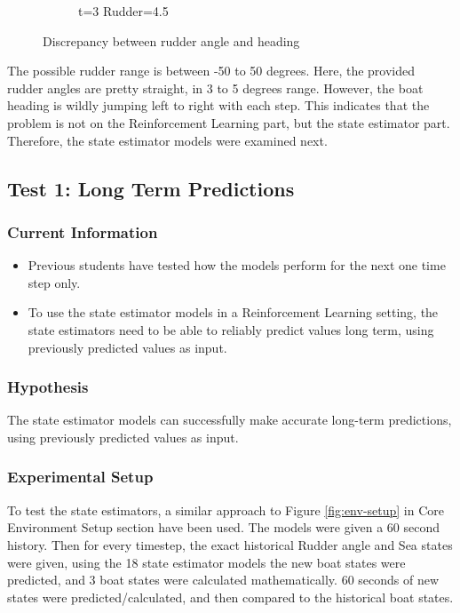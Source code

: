 \documentclass[12pt,twoside]{report}
\begin{document}
\begin{figure}[h]
\begin{subfigure}[b]{0.24\textwidth}
         \caption{t=3 Rudder=4.5}
     \end{subfigure}
        \caption{Discrepancy between rudder angle and heading}
        \label{fig:heading-problem}
\end{figure}

The possible rudder range is between -50 to 50 degrees. Here, the provided rudder angles are pretty straight, in 3 to 5 degrees range. However, the boat heading is wildly jumping left to right with each step. This indicates that the problem is not on the Reinforcement Learning part, but the state estimator part. Therefore, the state estimator models were examined next.

\subsection{Test 1: Long Term Predictions}

\subsubsection{Current Information}
\begin{itemize}
    \item Previous students have tested how the models perform for the next one time step only.
    \item To use the state estimator models in a Reinforcement Learning setting, the state estimators need to be able to reliably predict values long term, using previously predicted values as input.
\end{itemize}

\subsubsection{Hypothesis}
The state estimator models can successfully make accurate long-term predictions, using previously predicted values as input.

\subsubsection{Experimental Setup}
To test the state estimators, a similar approach to Figure \ref{fig:env-setup} in Core Environment Setup section have been used. The models were given a 60 second history. Then for every timestep, the exact historical Rudder angle and Sea states were given, using the 18 state estimator models the new boat states were predicted, and 3 boat states were calculated mathematically. 60 seconds of new states were predicted/calculated, and then compared to the historical boat states.
\end{document}
